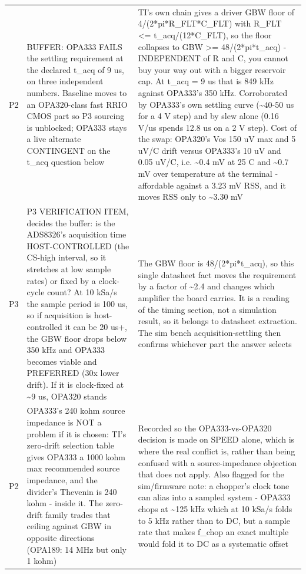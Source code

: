 \documentclass[11pt,a4paper]{article}
\begin{document}
{\begin{longtable}{lp{5.2cm}p{7.2cm}}
P2 & BUFFER: OPA333 FAILS the settling requirement at the declared t\_acq of 9 us, on three independent numbers. Baseline moves to an OPA320-class fast RRIO CMOS part so P3 sourcing is unblocked; OPA333 stays a live alternate CONTINGENT on the t\_acq question below & TI's own chain gives a driver GBW floor of 4/(2{*}pi{*}R\_FLT{*}C\_FLT) with R\_FLT \textless{}= t\_acq/(12{*}C\_FLT), so the floor collapses to GBW \textgreater{}= 48/(2{*}pi{*}t\_acq) - INDEPENDENT of R and C, you cannot buy your way out with a bigger reservoir cap. At t\_acq = 9 us that is 849 kHz against OPA333's 350 kHz. Corroborated by OPA333's own settling curve (\textasciitilde{}40-50 us for a 4 V step) and by slew alone (0.16 V/us spends 12.8 us on a 2 V step). Cost of the swap: OPA320's Vos 150 uV max and 5 uV/C drift versus OPA333's 10 uV and 0.05 uV/C, i.e. \textasciitilde{}0.4 mV at 25 C and \textasciitilde{}0.7 mV over temperature at the terminal - affordable against a 3.23 mV RSS, and it moves RSS only to \textasciitilde{}3.30 mV \\
P3 & P3 VERIFICATION ITEM, decides the buffer: is the ADS8326's acquisition time HOST-CONTROLLED (the CS-high interval, so it stretches at low sample rates) or fixed by a clock-cycle count? At 10 kSa/s the sample period is 100 us, so if acquisition is host-controlled it can be 20 us+, the GBW floor drops below 350 kHz and OPA333 becomes viable and PREFERRED (30x lower drift). If it is clock-fixed at \textasciitilde{}9 us, OPA320 stands & The GBW floor is 48/(2{*}pi{*}t\_acq), so this single datasheet fact moves the requirement by a factor of \textasciitilde{}2.4 and changes which amplifier the board carries. It is a reading of the timing section, not a simulation result, so it belongs to datasheet extraction. The sim bench acquisition-settling then confirms whichever part the answer selects \\
P2 & OPA333's 240 kohm source impedance is NOT a problem if it is chosen: TI's zero-drift selection table gives OPA333 a 1000 kohm max recommended source impedance, and the divider's Thevenin is 240 kohm - inside it. The zero-drift family trades that ceiling against GBW in opposite directions (OPA189: 14 MHz but only 1 kohm) & Recorded so the OPA333-vs-OPA320 decision is made on SPEED alone, which is where the real conflict is, rather than being confused with a source-impedance objection that does not apply. Also flagged for the sim/firmware note: a chopper's clock tone can alias into a sampled system - OPA333 chops at \textasciitilde{}125 kHz which at 10 kSa/s folds to 5 kHz rather than to DC, but a sample rate that makes f\_chop an exact multiple would fold it to DC as a systematic offset \\

\end{longtable}}
\end{document}
